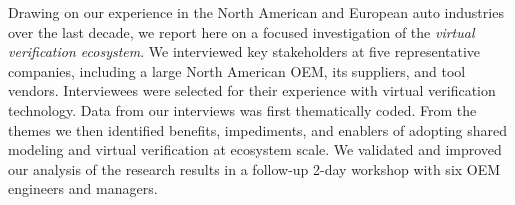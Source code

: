 
Drawing on our experience in the North American and European auto industries over the last decade, we report here on a focused investigation of the \emph{virtual verification ecosystem}.
We interviewed key stakeholders at five representative companies, including a large North American OEM, its suppliers, and tool vendors.
Interviewees were selected for their experience with virtual verification technology.
Data from our interviews was first thematically coded.
From the themes we then identified benefits, impediments, and enablers of adopting shared modeling and virtual verification at ecosystem scale.
We validated and improved our analysis of the research results in a follow-up 2-day workshop with six OEM engineers and managers.

